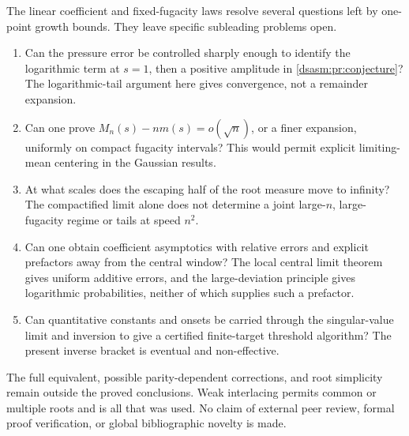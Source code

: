 \documentclass[11pt,letterpaper]{article}
\theoremstyle{remark}\newtheorem{remark}[theorem]{Remark}
\begin{document}
The linear coefficient and fixed-fugacity laws resolve several
questions left by one-point growth bounds. They leave specific
subleading problems open.
\begin{enumerate}
\item Can the pressure error be controlled sharply enough to identify
the logarithmic term at $s=1$, then a positive amplitude in
\eqref{dsasm:pr:conjecture}? The logarithmic-tail argument here gives convergence,
not a remainder expansion.
\item Can one prove $M_n(s)-nm(s)=o(\sqrt n)$, or a finer expansion,
uniformly on compact fugacity intervals? This would permit explicit
limiting-mean centering in the Gaussian results.
\item At what scales does the escaping half of the root measure move
to infinity? The compactified limit alone does not determine a joint
large-$n$, large-fugacity regime or tails at speed $n^2$.
\item Can one obtain coefficient asymptotics with relative errors and
explicit prefactors away from the central window? The local central
limit theorem gives uniform additive errors, and the large-deviation
principle gives logarithmic probabilities, neither of which supplies
such a prefactor.
\item Can quantitative constants and onsets be carried through the
singular-value limit and inversion to give a certified finite-target
threshold algorithm? The present inverse bracket is eventual and
non-effective.
\end{enumerate}
The full equivalent, possible parity-dependent corrections, and
root simplicity remain outside the proved conclusions. Weak
interlacing permits common or multiple roots and is all that was used.
No claim of external peer review, formal proof verification, or global
bibliographic novelty is made.
\end{document}
